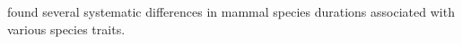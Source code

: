 \documentclass[12pt,letterpaper]{article}
\begin{document}
 \citet{Smits2015} found several systematic differences in mammal species durations associated with various species traits.





\end{document}
